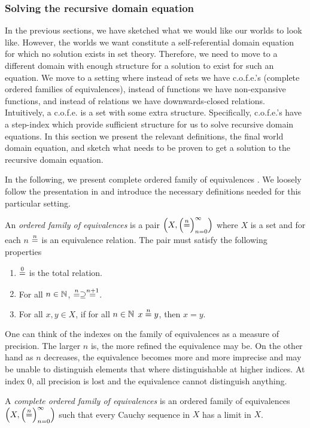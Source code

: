 \begin{jversion}
\subsubsection{Solving the recursive domain equation}
\label{subsubsec:rec-dom-eq}
In the previous sections, we have sketched what we would like our worlds to look like.
However, the worlds we want constitute a self-referential domain equation for which no solution exists in set theory.
Therefore, we need to move to a different domain with enough structure for a solution to exist for such an equation.
We move to a setting where instead of sets we have c.o.f.e.'s (complete ordered families of equivalences), instead of functions we have non-expansive functions, and instead of relations we have downwards-closed relations.
Intuitively, a c.o.f.e. is a set with some extra structure.
Specifically, c.o.f.e.'s have a step-index which provide sufficient structure for us to solve recursive domain equations.
In this section we present the relevant definitions, the final world domain equation, and sketch what needs to be proven to get a solution to the recursive domain equation.

In the following, we present complete ordered family of equivalences \citep{di_gianantonio_2002}.
We loosely follow the presentation in \citet{birkedal_taste_2014} and introduce the necessary definitions needed for this particular setting.
\begin{definition}
An \emph{ordered family of equivalences} is a pair $\cofe{X}$ where $X$ is a set and for each $n$ $\nequal$ is an equivalence relation.
The pair must satisfy the following properties
\begin{enumerate}
\item $\nequal[0]$ is the total relation.
\item For all $n \in \nats$, $\nequal[n] \supseteq \nequal[n+1]$.
\item For all $x,y \in X$,  if for all $n \in \nats$ $x \nequal y$, then $x = y$.
\end{enumerate}
\end{definition}
\noindent One can think of the indexes on the family of equivalences as a measure of precision.
The larger $n$ is, the more refined the equivalence may be.
On the other hand as $n$ decreases, the equivalence becomes more and more imprecise and may be unable to distinguish elements that where distinguishable at higher indices.
At index 0, all precision is lost and the equivalence cannot distinguish anything.
\begin{definition}
  \label{def:cauchy-sequence}
  A \emph{complete ordered family of equivalences} is an ordered family of equivalences
  $\cofe{X}$ such that every Cauchy sequence in $X$ has a limit
  in $X$.


\end{definition}
\end{jversion}
